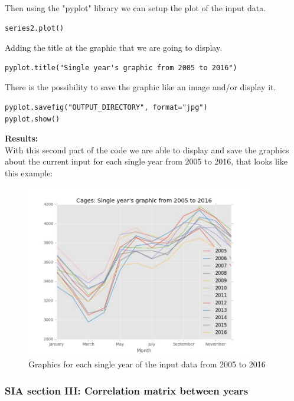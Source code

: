 Then using the "pyplot" library we can setup the plot of the input data.
\begin{lstlisting}
series2.plot()
\end{lstlisting}

Adding the title at the graphic that we are going to display.
\begin{lstlisting}
pyplot.title("Single year's graphic from 2005 to 2016")
\end{lstlisting}

There is the possibility to save the graphic like an image and/or display it.
\begin{lstlisting}
pyplot.savefig("OUTPUT_DIRECTORY", format="jpg")
pyplot.show()
\end{lstlisting}


\begin{minipage}{0.5\textwidth}
\textbf{Results:} \\
With this second part of the code we are able to display and save the graphics about the current input for each single year from 2005 to 2016, that looks like this example:
\end{minipage} \hfill
\begin{minipage}{0.45\textwidth}
\begin{figure}[H]
    \includegraphics[width=0.9\textwidth]{Files/Cages_Years.jpg}
    \caption{Graphics for each single year of the input data from 2005 to 2016}
\end{figure}
\end{minipage}



\newpage
\subsubsection{SIA section III: Correlation matrix between years}

